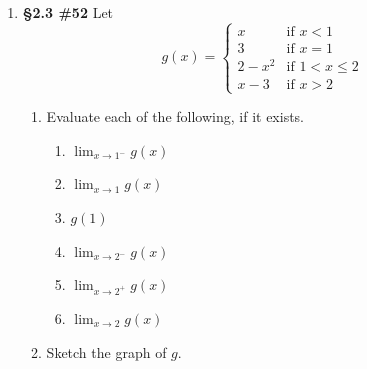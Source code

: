 \documentclass[%
]{article}
\begin{document}
\begin{enumerate}
\item {\bf \S2.3 \#52} Let 
\[
g(x)=\begin{cases}
	x & \text{if }x<1 \\
	3 & \text{if }x=1 \\
	2-x^2 & \text{if }1<x\leq 2 \\
	x-3 & \text{if }x>2
	\end{cases}
\]
	\begin{enumerate}
	\item Evaluate each of the following, if it exists.
		\begin{enumerate}
		\item $\lim_{x\to 1^-}g(x)$
		\item $\lim_{x\to 1}g(x)$
		\item $g(1)$
		\item $\lim_{x\to 2^-}g(x)$
		\item $\lim_{x\to 2^+}g(x)$
		\item $\lim_{x\to 2}g(x)$
		\end{enumerate}
	\item Sketch the graph of $g$.
	\end{enumerate}

\end{enumerate}
\end{document}
